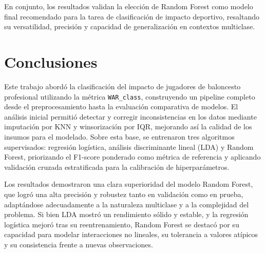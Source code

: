 \begin{multicols}{2}
En conjunto, los resultados validan la elección de Random Forest como modelo final recomendado para la tarea de clasificación de impacto deportivo, resaltando su versatilidad, precisión y capacidad de generalización en contextos multiclase.



\section{Conclusiones}

Este trabajo abordó la clasificación del impacto de jugadores de baloncesto profesional utilizando la métrica \texttt{WAR\_class}, construyendo un pipeline completo desde el preprocesamiento hasta la evaluación comparativa de modelos. El análisis inicial permitió detectar y corregir inconsistencias en los datos mediante imputación por KNN y winsorización por IQR, mejorando así la calidad de los insumos para el modelado. Sobre esta base, se entrenaron tres algoritmos supervisados: regresión logística, análisis discriminante lineal (LDA) y Random Forest, priorizando el F1-score ponderado como métrica de referencia y aplicando validación cruzada estratificada para la calibración de hiperparámetros.

Los resultados demostraron una clara superioridad del modelo Random Forest, que logró una alta precisión y robustez tanto en validación como en prueba, adaptándose adecuadamente a la naturaleza multiclase y a la complejidad del problema. Si bien LDA mostró un rendimiento sólido y estable, y la regresión logística mejoró tras su reentrenamiento, Random Forest se destacó por su capacidad para modelar interacciones no lineales, su tolerancia a valores atípicos y su consistencia frente a nuevas observaciones. 


\end{multicols}